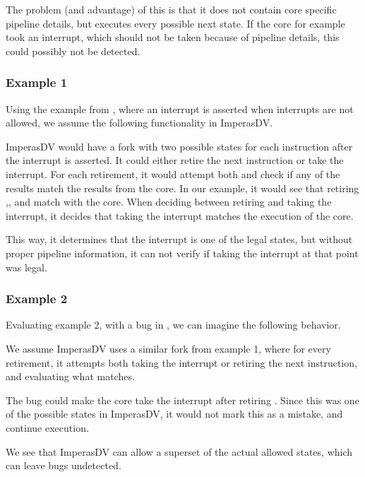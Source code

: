 The problem (and advantage) of this is that it does not contain core specific pipeline details, but executes every possible next state. If the core for example took an interrupt, which should not be taken because of pipeline details, this could possibly not be detected. 

\subsubsection{Example 1}


Using the example from , where an interrupt is asserted when interrupts are not allowed, we assume the following functionality in ImperasDV.

ImperasDV would have a fork with two possible states for each instruction after the interrupt is asserted. It could either retire the next instruction or take the interrupt. For each retirement, it would attempt both and check if any of the results match the results from the core. In our example, it would see that retiring ,, and  match with the core. When deciding between retiring  and taking the interrupt, it decides that taking the interrupt matches the execution of the core.

This way, it determines that the interrupt is one of the legal states, but without proper pipeline information, it can not verify if taking the interrupt at that point was legal.

\subsubsection{Example 2}

Evaluating example 2, with a bug in , we can imagine the following behavior. 

We assume ImperasDV uses a similar fork from example 1, where for every retirement, it attempts both taking the interrupt or retiring the next instruction, and evaluating what matches. 

The bug could make the core take the interrupt after retiring .  Since this was one of the possible states in ImperasDV, it would not mark this as a mistake, and continue execution.

We see that ImperasDV can allow a superset of the actual allowed states, which can leave bugs undetected.

